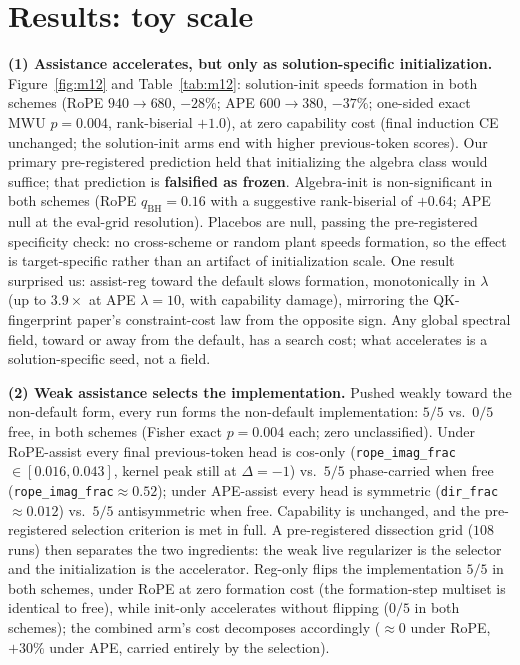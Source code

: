 \documentclass[11pt]{article}
\newcommand{\dirfrac}{\texttt{dir\_frac}\xspace}
\newcommand{\rif}{\texttt{rope\_imag\_frac}\xspace}
\begin{document}
\section{Results: toy scale}\label{sec:results}
\textbf{(1) Assistance accelerates, but only as solution-specific initialization.} Figure~\ref{fig:m12} and
Table~\ref{tab:m12}: solution-init speeds formation in both schemes (RoPE $940{\to}680$, $-28\%$; APE
$600{\to}380$, $-37\%$; one-sided exact MWU $p{=}0.004$, rank-biserial $+1.0$), at zero capability cost
(final induction CE unchanged; the solution-init arms end with higher previous-token scores). Our
primary pre-registered prediction held that initializing the algebra class would suffice; that prediction
is \textbf{falsified as frozen}. Algebra-init is non-significant in both schemes (RoPE $q_{\mathrm{BH}}{=}0.16$
with a suggestive rank-biserial of $+0.64$; APE null at the eval-grid resolution). Placebos are null, passing the
pre-registered specificity check: no cross-scheme or random plant speeds formation, so the effect is
target-specific rather than an artifact of initialization scale. One result surprised us: assist-reg
toward the default slows formation, monotonically in $\lambda$ (up to $3.9\times$ at APE
$\lambda{=}10$, with capability damage), mirroring the QK-fingerprint paper's constraint-cost law from the
opposite sign. Any global spectral field, toward or away from the default, has a search cost; what
accelerates is a solution-specific seed, not a field.

\textbf{(2) Weak assistance selects the implementation.} Pushed weakly toward the non-default form, every
run forms the non-default implementation: $5/5$ vs.\ $0/5$ free, in both schemes (Fisher exact
$p{=}0.004$ each; zero unclassified). Under RoPE-assist every final previous-token head is cos-only
(\rif${\in}[0.016,0.043]$, kernel peak still at $\Delta{=}{-}1$) vs.\ $5/5$ phase-carried when free
(\rif${\approx}0.52$); under APE-assist every head is symmetric (\dirfrac${\approx}0.012$) vs.\ $5/5$ antisymmetric
when free. Capability is unchanged, and the pre-registered selection criterion is met in full. A pre-registered
dissection grid ($108$ runs) then separates the two ingredients: the weak live regularizer is the selector
and the initialization is the accelerator. Reg-only flips the implementation $5/5$ in both schemes, under RoPE at
zero formation cost (the formation-step multiset is identical to free), while init-only accelerates without
flipping ($0/5$ in both schemes); the combined arm's cost decomposes accordingly ($\approx0$ under RoPE, $+30\%$
under APE, carried entirely by the selection).
\end{document}
